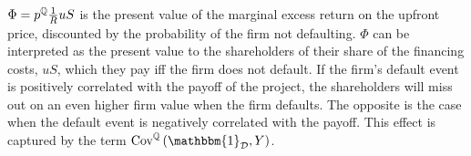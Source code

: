 \documentclass[../main.tex]{subfiles}
\begin{document}
        $\Phi = p^{\mathbb{Q}} \frac{1}{R} u S$
        is the present value of the marginal excess return on the upfront price, 
        discounted by the probability of the firm not defaulting.
        $\Phi$ can be interpreted as the present value to the shareholders of their share of the financing costs, $uS$,
        which they pay iff the firm does not default. 
        If the firm's default event is positively correlated with the payoff of the project,
        the shareholders will miss out on an even higher firm value when the firm defaults.
        The opposite is the case when the default event is negatively correlated with the payoff.
        This effect is captured by the term 
        $\text{Cov}^{\mathbb{Q}}\left(\mathbbm{1}_{\mathcal{D}}, Y\right)$.
\end{document}
